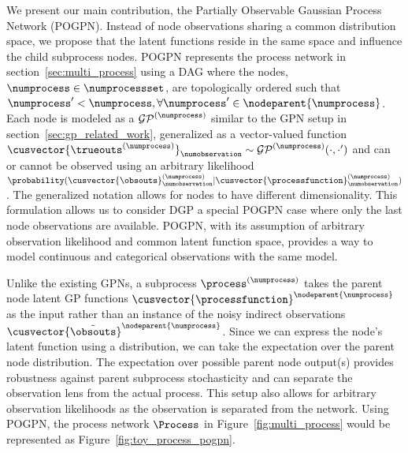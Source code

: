 We present our main contribution, the Partially Observable Gaussian Process Network (POGPN). Instead of node observations sharing a common distribution space, we propose that the latent functions reside in the same space and influence the child subprocess nodes. POGPN represents the process network in section~\ref{sec:multi_process} using a DAG where the nodes, $\numprocess\in\numprocessset$, are topologically ordered such that $\numprocess'<\numprocess,\forall \numprocess' \in \nodeparent{\numprocess}$. Each node is modeled as a $\mathcal{GP}^{(\numprocess)}$ similar to the GPN setup in section~\ref{sec:gp_related_work}, generalized as a vector-valued function $\cusvector{\trueouts^{(\numprocess)}}_{\numobservation}\sim\mathcal{GP}^{(\numprocess)}(\cdot, \cdot')$ and can or cannot be observed using an arbitrary likelihood $\probability(\cusvector{\obsouts}^{(\numprocess)}_{\numobservation}\vert\cusvector{\processfunction}^{(\numprocess)}_{\numobservation})$. The generalized notation allows for nodes to have different dimensionality. This formulation allows us to consider DGP a special POGPN case where only the last node observations are available. POGPN, with its assumption of arbitrary observation likelihood and common latent function space, provides a way to model continuous and categorical observations with the same model.

Unlike the existing GPNs, a subprocess $\process^{(\numprocess)}$ takes the parent node latent GP functions $\cusvector{\processfunction}^{\nodeparent{\numprocess}}$ as the input rather than an instance of the noisy indirect observations $\cusvector{\tilde{\obsouts}}^{\nodeparent{\numprocess}}$. Since we can express the node's latent function using a distribution, we can take the expectation over the parent node distribution. The expectation over possible parent node output(s) provides robustness against parent subprocess stochasticity and can separate the observation lens from the actual process. This setup also allows for arbitrary observation likelihoods as the observation is separated from the network. Using POGPN, the process network $\Process$ in Figure~\ref{fig:multi_process} would be represented as Figure~\ref{fig:toy_process_pogpn}.

